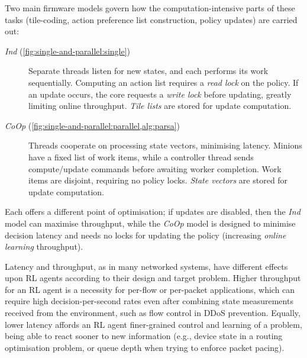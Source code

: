 \documentclass[sigconf,natbib=false]{acmart}
\newcommand{\Coopfw}{\emph{CoOp}}
\newcommand{\coopfw}{\Coopfw}
\newcommand{\Indfw}{\emph{Ind}}
\newcommand{\indfw}{\Indfw}
\begin{document}
Two main firmware models govern how the computation-intensive parts of these tasks (tile-coding, action preference list construction, policy updates) are carried out:
\begin{description}
	\item[\Indfw{} (\cref{fig:single-and-parallel:single})] Separate threads listen for new states, and each performs its work sequentially. Computing an action list requires a \emph{read lock} on the policy. If an update occurs, the core requests a \emph{write lock} before updating, greatly limiting online throughput. \emph{Tile lists} are stored for update computation.
	\item[\Coopfw{} (\cref{fig:single-and-parallel:parallel,alg:parsa})] Threads cooperate on processing state vectors, minimising latency. Minions have a fixed list of work items, while a controller thread sends compute/update commands before awaiting worker completion. Work items are disjoint, requiring no policy locks. \emph{State vectors} are stored for update computation.
\end{description}
Each offers a different point of optimisation; if updates are disabled, then the \emph{\indfw{}} model can maximise throughput, while the \emph{\coopfw{}} model is designed to minimise decision latency and needs no locks for updating the policy (increasing \emph{online learning} throughput).

Latency and throughput, as in many networked systems, have different effects upon RL agents according to their design and target problem.
Higher throughput for an RL agent is a necessity for per-flow or per-packet applications, which can require high decision-per-second rates even after combining state measurements received from the environment, such as flow control in DDoS prevention.
Equally, lower latency affords an RL agent finer-grained control and learning of a problem, being able to react sooner to new information (e.g., device state in a routing optimisation problem, or queue depth when trying to enforce packet pacing).
\end{document}
